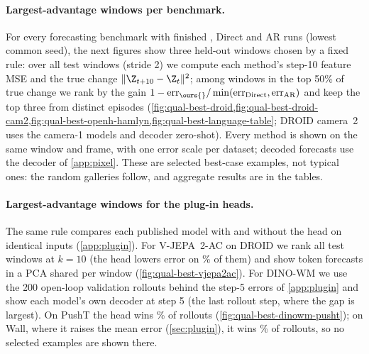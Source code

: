 \paragraph{Largest-advantage windows per benchmark.} For every forecasting benchmark with finished \ours{}, Direct and AR
runs (lowest common seed), the next figures show three held-out windows chosen by a fixed rule: over all test windows
(stride 2) we compute each method's step-10 feature MSE and the true change $\|\Z_{t+10}-\Z_t\|^2$; among windows in the
top 50\% of true change we rank by the gain $1-\mathrm{err}_{\text{\ours{}}}/\min(\mathrm{err}_{\text{Direct}},\mathrm{err}_{\text{AR}})$
and keep the top three from distinct episodes (\cref{fig:qual-best-droid,fig:qual-best-droid-cam2,fig:qual-best-openh-hamlyn,fig:qual-best-language-table}; DROID camera~2 uses the camera-1 models and decoder zero-shot). Every method is shown on the same window and frame, with one error scale
per dataset; decoded forecasts use the decoder of \cref{app:pixel}. These are selected best-case examples, not typical
ones: the random galleries follow, and aggregate results are in the tables.

\paragraph{Largest-advantage windows for the plug-in heads.} The same rule compares each published model with and without
the \ours{} head on identical inputs (\cref{app:plugin}). For V-JEPA~2-AC on DROID we rank all test windows at $k{=}10$
(the head lowers error on \qbWinVjepa\% of them) and show token forecasts in a PCA shared per window
(\cref{fig:qual-best-vjepa2ac}). For DINO-WM we use the 200 open-loop validation rollouts behind the step-5 errors of
\cref{app:plugin} and show each model's own decoder at step 5 (the last rollout step, where the gap is largest). On PushT the head
wins \qbWinPusht\% of rollouts (\cref{fig:qual-best-dinowm-pusht}); on Wall, where it raises the mean error
(\cref{sec:plugin}), it wins \qbWinWall\% of rollouts, so no selected examples are shown there.

